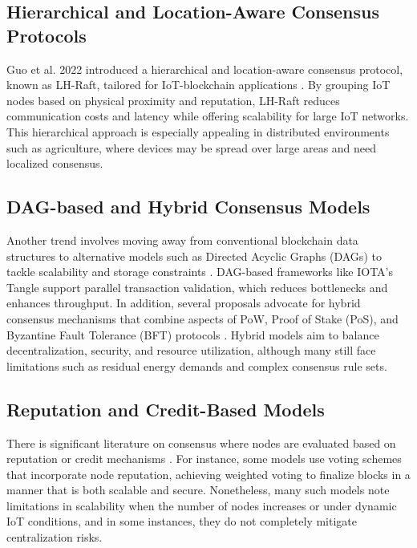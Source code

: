 \documentclass[12pt,onecolumn]{IEEEtran} %
\begin{document}
\subsection{Hierarchical and Location-Aware Consensus Protocols}
Guo et al. 2022 introduced a hierarchical and location-aware consensus protocol, known as LH-Raft, tailored for IoT-blockchain applications \cite{guo2022ahierarchicaland}. By grouping IoT nodes based on physical proximity and reputation, LH-Raft reduces communication costs and latency while offering scalability for large IoT networks. This hierarchical approach is especially appealing in distributed environments such as agriculture, where devices may be spread over large areas and need localized consensus.

\subsection{DAG-based and Hybrid Consensus Models}
Another trend involves moving away from conventional blockchain data structures to alternative models such as Directed Acyclic Graphs (DAGs) to tackle scalability and storage constraints \cite{khan2022asurveyand, bryant2022keychallengesin}. DAG-based frameworks like IOTA's Tangle support parallel transaction validation, which reduces bottlenecks and enhances throughput. In addition, several proposals advocate for hybrid consensus mechanisms that combine aspects of PoW, Proof of Stake (PoS), and Byzantine Fault Tolerance (BFT) protocols \cite{guru2023asurveyon, khan2022asurveyand}. Hybrid models aim to balance decentralization, security, and resource utilization, although many still face limitations such as residual energy demands and complex consensus rule sets.

\subsection{Reputation and Credit-Based Models}
There is significant literature on consensus where nodes are evaluated based on reputation or credit mechanisms \cite{morais2023surveyonintegration, khan2022asurveyand}. For instance, some models use voting schemes that incorporate node reputation, achieving weighted voting to finalize blocks in a manner that is both scalable and secure. Nonetheless, many such models note limitations in scalability when the number of nodes increases or under dynamic IoT conditions, and in some instances, they do not completely mitigate centralization risks.
\end{document}
